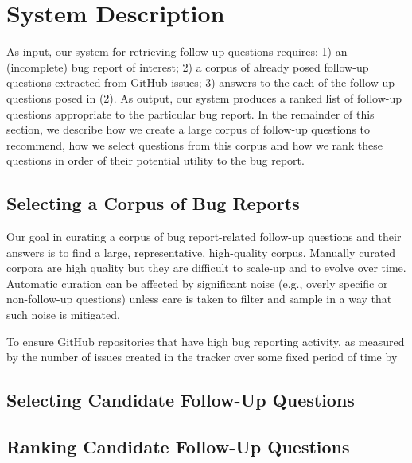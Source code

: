 \section{System Description}

As input, our system for retrieving follow-up questions requires: 1) an (incomplete) bug
report of interest; 2) a corpus of already posed follow-up questions extracted
from GitHub issues; 3) answers to the each of the follow-up questions posed in (2). As output, our system
produces a ranked list of follow-up questions appropriate to the particular bug report.
In the remainder of this section, we describe how we create a large corpus of follow-up questions
to recommend, how we select questions from this corpus and how we rank these questions in order
of their potential utility to the bug report.

\subsection{Selecting a Corpus of Bug Reports}

Our goal in curating a corpus of bug report-related follow-up questions and their answers
is to find a large, representative, high-quality corpus. Manually curated corpora are high quality but they
are difficult to scale-up and to evolve over time. Automatic curation can be affected by
significant noise (e.g., overly specific or non-follow-up questions) unless care is taken
to filter and sample in a way that such noise is mitigated.

To ensure  GitHub repositories that have high bug reporting activity, as measured by the number of
issues created in the tracker over some fixed period of time by




\subsection{Selecting Candidate Follow-Up Questions}


\subsection{Ranking Candidate Follow-Up Questions}

%
%
%

